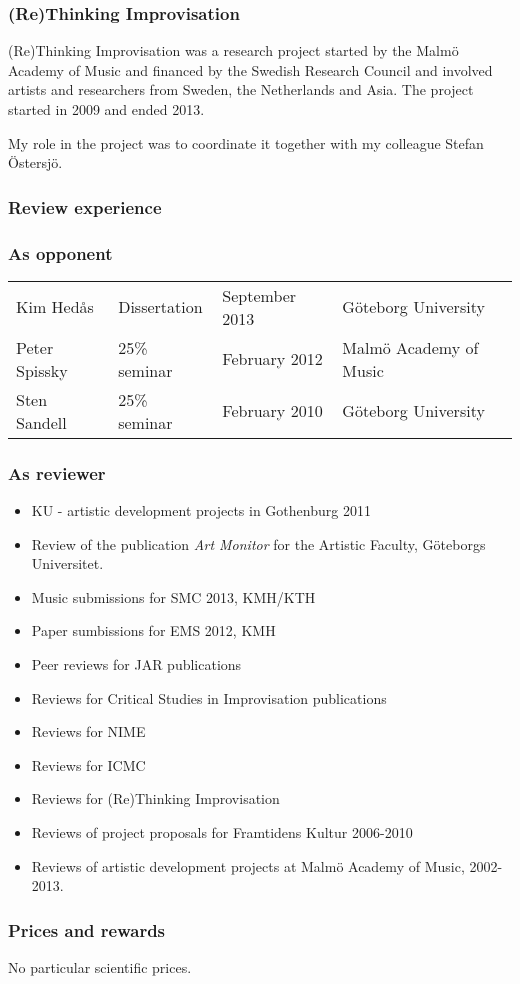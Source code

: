 \subsubsection*{\textsf{(Re)Thinking Improvisation}}

(Re)Thinking Improvisation was a research project started by the Malmö Academy of Music and financed by the Swedish Research Council and involved artists and researchers from Sweden, the Netherlands and Asia. The project started in 2009 and ended 2013. 

My role in the project was to coordinate it together with my colleague Stefan Östersjö. 

\subsubsection*{\textsf{Review experience}}

\subsubsection*{\textsf{As opponent}}
\begin{tabular}[c]{llll}
  Kim Hedås & Dissertation & September 2013 & Göteborg University \\
  Peter Spissky & 25\% seminar & February 2012 & Malmö Academy of Music \\
  Sten Sandell & 25\% seminar & February 2010 & Göteborg University \\
\end{tabular}

\subsubsection*{\textsf{As reviewer}}

\begin{itemize}
\item KU - artistic development projects in Gothenburg 2011
\item Review of the publication \emph{Art Monitor} for the Artistic Faculty, Göteborgs Universitet.
\item Music submissions for SMC 2013, KMH/KTH
\item Paper sumbissions for EMS 2012, KMH
\item Peer reviews for JAR publications
\item Reviews for Critical Studies in Improvisation publications
\item Reviews for NIME
\item Reviews for ICMC
\item Reviews for (Re)Thinking Improvisation
\item Reviews of project proposals for Framtidens Kultur 2006-2010
\item Reviews of artistic development projects at Malmö Academy of Music, 2002-2013.

\end{itemize}

\subsubsection*{\textsf{Prices and rewards}}

No particular scientific prices.

\newpage

